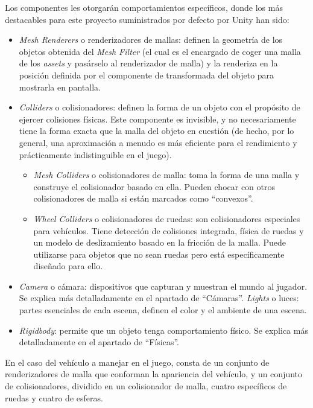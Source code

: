 Los componentes les otorgarán comportamientos específicos, donde los más destacables para este proyecto suministrados por defecto por Unity han sido: 
\begin{itemize}
\tightlist
    \item \textit{Mesh Renderers} o renderizadores de mallas: definen la geometría de los objetos obtenida del \textit{Mesh Filter} (el cual es el encargado de coger una malla de los \textit{assets} y pasárselo al renderizador de malla) y la renderiza en la posición definida por el componente de transformada del objeto para mostrarla en pantalla.
    \item \textit{Colliders} o colisionadores: definen la forma de un objeto con el propósito de ejercer colisiones físicas. Este componente es invisible, y no necesariamente tiene la forma exacta que la malla del objeto en cuestión (de hecho, por lo general, una aproximación a menudo es más eficiente para el rendimiento y prácticamente indistinguible en el juego).
   	\begin{itemize}
   	\tightlist
   		    \item \textit{Mesh Colliders} o colisionadores de malla: toma la forma de una malla y construye el colisionador basado en ella. Pueden chocar con otros colisionadores de malla si están marcados como ``convexos''.
   		    \item \textit{Wheel Colliders} o colisionadores de ruedas: son colisionadores especiales para vehículos. Tiene detección de colisiones integrada, física de ruedas y un modelo de deslizamiento basado en la fricción de la malla. Puede utilizarse para objetos que no sean ruedas pero está específicamente diseñado para ello.
   	\end{itemize}
   	\item \textit{Camera} o cámara: dispositivos que capturan y muestran el mundo al jugador. Se explica más detalladamente en el apartado de ``Cámaras''.
   	\textit{Lights} o luces: partes esenciales de cada escena, definen el color y el ambiente de una escena.
   	\item \textit{Rigidbody}: permite que un objeto tenga comportamiento físico. Se explica más detalladamente en el apartado de ``Físicas''.
\end{itemize}

En el caso del vehículo a manejar en el juego, consta de un conjunto de renderizadores de malla que conforman la apariencia del vehículo, y un conjunto de colisionadores, dividido en un colisionador de malla, cuatro específicos de ruedas y cuatro de esferas.

